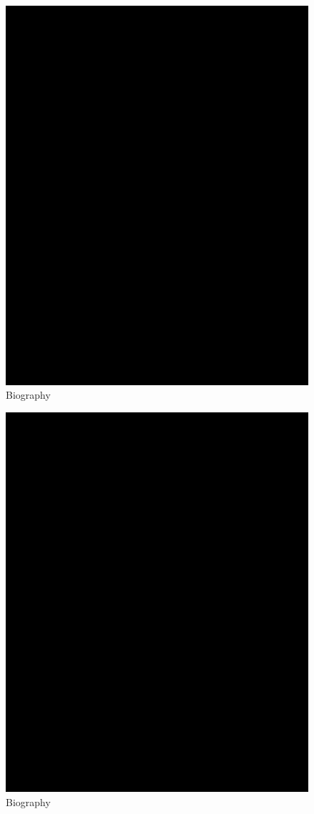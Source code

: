\documentclass{WileyMSP-template}
\begin{document}
\begin{figure}
  \includegraphics{bio-placeholder.jpg}
  \caption*{Biography}
\end{figure}

\begin{figure}
  \includegraphics{bio-placeholder.jpg}
  \caption*{Biography}
\end{figure}
\end{document}
